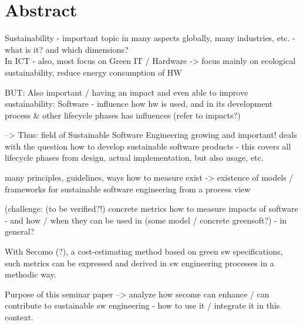 \chapter{Abstract}

Sustainability - important topic in many aspects globally, many industries, etc. - what is it? and which dimensions?\\
In ICT - also, most focus on Green IT / Hardware -> focus mainly on ecological sustainability, reduce energy consumption of HW

BUT: Also important / having an impact and even able to improve sustainability: Software - influence how hw is used, and in its development process & other lifecycle phases has influences (refer to impacts?)

--> Thus: field of Sustainable Software Engineering growing and important! deals with the question how to develop sustainable software products - this covers all lifecycle phases from design, actual implementation, but also usage, etc. 

many principles, guidelines, ways how to measure exist -> existence of models / frameworks for sustainable software engineering from a process view

(challenge: (to be verified?!) concrete metrics how to measure impacts of software - and how / when they can be used in (some model / concrete greensoft?) - in general?

With Secomo (?), a cost-estimating method based on green sw specifications, such metrics can be expressed and derived in sw engineering processes in a methodic way.

Purpose of this seminar paper --> analyze how secome can enhance / can contribute to sustainable sw engineering - how to use it / integrate it in this context.

